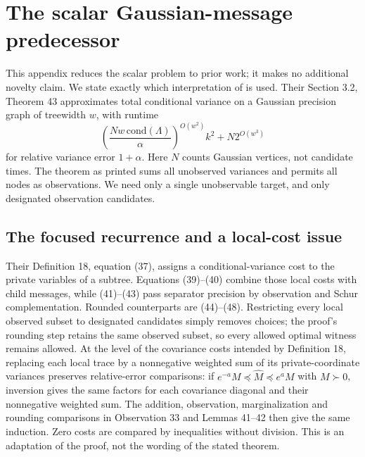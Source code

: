 \section{The scalar Gaussian-message predecessor}
\label{app:scalar-prior}
This appendix reduces the scalar problem to prior work; it makes no
additional novelty claim. We state exactly which interpretation of
\citet{Mahalanabis2012} is used. Their Section 3.2, Theorem 43 approximates total conditional variance on a
Gaussian precision graph of treewidth $w$, with runtime
\begin{equation}
 \left(\frac{Nw\,\mathrm{cond}(\Lambda)}{\alpha}\right)^{O(w^2)}k^2
       +N2^{O(w^3)}
 \label{eq:gmrf-runtime}
\end{equation}
for relative variance error $1+\alpha$. Here $N$ counts Gaussian vertices,
not candidate times. The theorem as printed sums all unobserved variances
and permits all nodes as observations. We need only a single unobservable
target, and only designated observation candidates.

\subsection{The focused recurrence and a local-cost issue}
Their Definition 18, equation (37), assigns a conditional-variance cost to
the private variables of a subtree. Equations (39)--(40) combine those local
costs with child messages, while (41)--(43) pass separator precision by
observation and Schur complementation. Rounded counterparts are (44)--(48).
Restricting every local observed subset to designated candidates simply
removes choices; the proof's rounding step retains the same observed subset,
so every allowed optimal witness remains allowed. At the level of the
covariance costs intended by Definition 18, replacing each local trace by a
nonnegative weighted sum of its private-coordinate variances preserves
relative-error comparisons: if
$e^{-a}M\preceq\widehat M\preceq e^aM$ with $M\succ0$, inversion gives
the same factors for each covariance diagonal and their nonnegative weighted
sum. The addition, observation, marginalization and rounding comparisons in
Observation 33 and Lemmas 41--42 then give the same induction. Zero costs
are compared by inequalities without division. This is an adaptation of the
proof, not the wording of the stated theorem.

